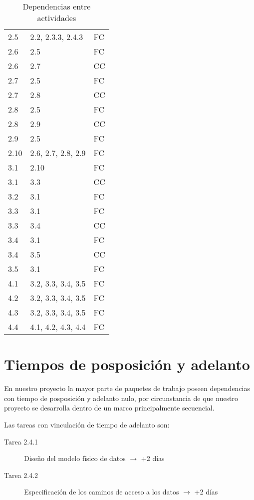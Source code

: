 \documentclass[11pt,a4paper,spanish,twoside]{book}
\begin{document}
\begin{table}[!h]
\begin{tabular}{|l|p{5cm}|l|}
    2.5   & 2.2, 2.3.3, 2.4.3    & FC \\
    2.6   & 2.5                  & FC \\
    2.6   & 2.7                  & CC \\
    2.7   & 2.5                  & FC \\
    2.7   & 2.8                  & CC \\
    2.8   & 2.5                  & FC \\
    2.8   & 2.9                  & CC \\
    2.9   & 2.5                  & FC \\
    2.10  & 2.6, 2.7, 2.8, 2.9   & FC \\
    \hline
    3.1   & 2.10                 & FC \\
    3.1   & 3.3                  & CC \\
    3.2   & 3.1                  & FC \\
    3.3   & 3.1                  & FC \\
    3.3   & 3.4                  & CC \\
    3.4   & 3.1                  & FC \\
    3.4   & 3.5                  & CC \\
    3.5   & 3.1                  & FC \\
    \hline
    4.1   & 3.2, 3.3, 3.4, 3.5   & FC \\
    4.2   & 3.2, 3.3, 3.4, 3.5   & FC \\
    4.3   & 3.2, 3.3, 3.4, 3.5   & FC \\
    4.4   & 4.1, 4.2, 4.3, 4.4   & FC \\
    \hline
    
  \end{tabular}
  \caption{Dependencias entre actividades} \label{Tab:Dep}
\end{table}


\section{Tiempos de posposición y adelanto}
En nuestro proyecto la mayor parte de paquetes de trabajo poseen dependencias
con tiempo de posposición y adelanto nulo, por circunstancia de que nuestro
proyecto se desarrolla dentro de un marco principalmente secuencial.

Las tareas con vinculación de tiempo de adelanto son:
\begin{description}
\item[Tarea 2.4.1] Diseño del modelo físico de datos $\to$ +2 días
\item[Tarea 2.4.2] Especificación de los caminos de acceso a los datos $\to$
  +2 días
\end{description}
\end{document}
